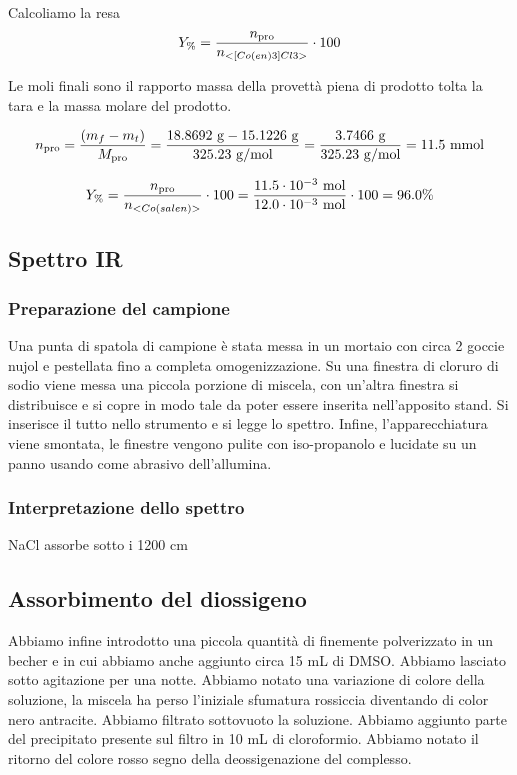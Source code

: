 Calcoliamo la resa 
\[ Y_\% = \frac{n_\text{pro}}{n_{<[Co(en)3]Cl3>}}\cdot 100 \]

Le moli finali sono il rapporto massa della provettà piena di prodotto tolta la tara e la massa molare del prodotto.

\[ n_\text{pro} = \frac{(m_{f} - m_{t})}{M_\text{pro}} 
 = \frac{ 18.8692 \mathrm{\ g} - 15.1226 \mathrm{\ g} }{ 325.23 \mathrm{\ g/mol}} =  \frac{3.7466 \mathrm{~g}}{325.23 \mathrm{~g} / \mathrm{mol}}=11.5 \mathrm{\ mmol}\]

\[ Y_\% = \frac{n_\text{pro}}{n_{<Co(salen)>}}\cdot 100  = \frac{  11.5 \cdot 10^{-3} \mathrm{~mol}}{12.0 \cdot 10^{-3} \mathrm{~mol}} \cdot 100 =96.0\%\]


\subsection{Spettro IR}


\subsubsection{Preparazione del campione}
Una punta di spatola di campione è stata messa in un mortaio con circa 2 goccie nujol e pestellata fino a completa omogenizzazione.  Su una finestra di cloruro di sodio viene messa una piccola porzione di miscela, con un'altra finestra si distribuisce e si copre in modo tale da poter essere inserita nell'apposito stand. Si inserisce il tutto nello strumento e si legge lo spettro. Infine, l'apparecchiatura viene smontata, le finestre vengono pulite con iso-propanolo  e lucidate su un panno usando come abrasivo dell'allumina.
\subsubsection{Interpretazione dello spettro}

NaCl assorbe sotto i 1200 cm

\subsection{Assorbimento del diossigeno}
Abbiamo infine introdotto una piccola quantità di  finemente polverizzato in un becher e in cui abbiamo anche aggiunto circa 15 mL di DMSO. Abbiamo lasciato sotto agitazione per una notte. Abbiamo notato una variazione di colore della soluzione, la miscela ha perso l'iniziale sfumatura rossiccia diventando di color nero antracite. Abbiamo filtrato sottovuoto la soluzione. Abbiamo aggiunto parte del precipitato presente sul filtro in 10 mL di cloroformio. Abbiamo notato il ritorno del colore rosso segno della deossigenazione del complesso.

